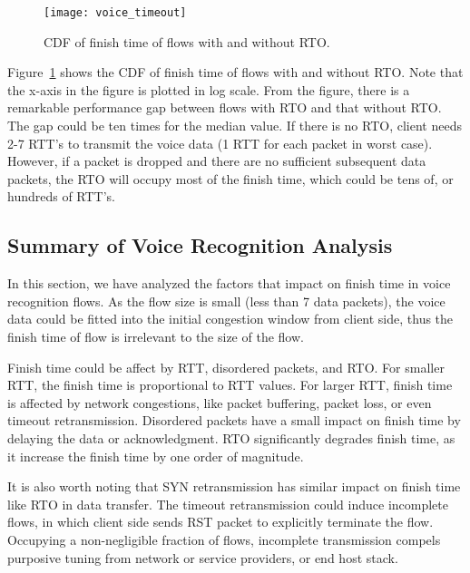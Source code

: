 \begin{figure}[th]
\centering
	\texttt{[image: voice\_timeout]}
\caption{CDF of finish time of flows with and without RTO.}
\label{fig:voice_rto}
\end{figure}

Figure~\ref{fig:voice_rto} shows the CDF of finish time of flows with and without RTO. Note that the x-axis in the figure is plotted in log scale. From the figure, there is a remarkable performance gap between flows with RTO and that without RTO. The gap could be ten times for the median value. If there is no RTO, client needs 2-7 RTT's to transmit the voice data (1 RTT for each packet in worst case). However, if a packet is dropped and there are no sufficient subsequent data packets, the RTO will occupy most of the finish time, which could be tens of, or hundreds of RTT's.

\subsection{Summary of Voice Recognition Analysis}

In this section, we have analyzed the factors that impact on finish time in voice recognition flows. As the flow size is small (less than 7 data packets), the voice data could be fitted into the initial congestion window from client side, thus the finish time of flow is irrelevant to the size of the flow.

Finish time could be affect by RTT, disordered packets, and RTO. For smaller RTT, the finish time is proportional to RTT values. For larger RTT, finish time is affected by network congestions, like packet buffering, packet loss, or even timeout retransmission. Disordered packets have a small impact on finish time by delaying the data or acknowledgment. RTO significantly degrades finish time, as it increase the finish time by one order of magnitude.

It is also worth noting that SYN retransmission has similar impact on finish time like RTO in data transfer. The timeout retransmission could induce incomplete flows, in which client side sends RST packet to explicitly terminate the flow. Occupying a non-negligible fraction of flows, incomplete transmission compels purposive tuning from network or service providers, or end host stack. 
